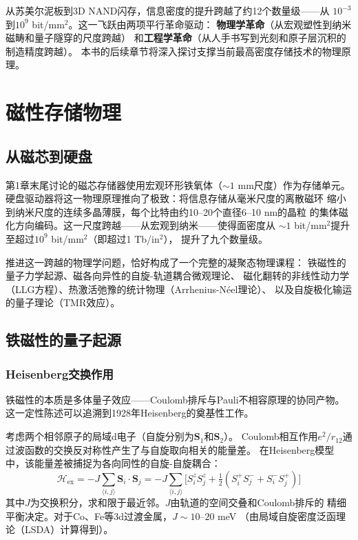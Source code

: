 \documentclass[11pt,a4paper,openany]{book}
\theoremstyle{definition}
\theoremstyle{plain}
\theoremstyle{remark}
\begin{document}
从苏美尔泥板到3D NAND闪存，信息密度的提升跨越了约12个数量级——从
$10^{-3}$到$10^9$ bit/mm$^2$。这一飞跃由两项平行革命驱动：
\textbf{物理学革命}（从宏观塑性到纳米磁畴和量子隧穿的尺度跨越）
和\textbf{工程学革命}（从人手书写到光刻和原子层沉积的制造精度跨越）。
本书的后续章节将深入探讨支撑当前最高密度存储技术的物理原理。

\chapter{磁性存储物理}
\label{ch:magnetic}

\section{从磁芯到硬盘}

第1章末尾讨论的磁芯存储器使用宏观环形铁氧体（$\sim 1$ mm尺度）作为存储单元。
硬盘驱动器将这一物理原理推向了极致：将信息存储从毫米尺度的离散磁环
缩小到纳米尺度的连续多晶薄膜，每个比特由约10--20个直径6--10 nm的晶粒
的集体磁化方向编码。这一尺度跨越——从宏观到纳米——使得面密度从
$\sim 1$ bit/mm$^2$提升至超过$10^9$ bit/mm$^2$（即超过1 Tb/in$^2$），
提升了九个数量级。

推进这一跨越的物理学问题，恰好构成了一个完整的凝聚态物理课程：
铁磁性的量子力学起源、磁各向异性的自旋-轨道耦合微观理论、
磁化翻转的非线性动力学（LLG方程）、热激活弛豫的统计物理（Arrhenius-N\'{e}el理论）、
以及自旋极化输运的量子理论（TMR效应）。

\section{铁磁性的量子起源}

\subsection{Heisenberg交换作用}

铁磁性的本质是多体量子效应——Coulomb排斥与Pauli不相容原理的协同产物。
这一定性陈述可以追溯到1928年Heisenberg的奠基性工作。

考虑两个相邻原子的局域d电子（自旋分别为$\mathbf{S}_1$和$\mathbf{S}_2$）。
Coulomb相互作用$e^2/r_{12}$通过波函数的交换反对称性产生了与自旋取向相关的能量差。
在Heisenberg模型中，该能量差被捕捉为各向同性的自旋-自旋耦合：
\begin{equation}\label{eq:heisenberg}
  \mathcal{H}_{\text{ex}} = -J \sum_{\langle i,j\rangle} \mathbf{S}_i \cdot \mathbf{S}_j
  = -J \sum_{\langle i,j\rangle} \bigl[ S_i^z S_j^z
    + \tfrac{1}{2}(S_i^+ S_j^- + S_i^- S_j^+) \bigr]
\end{equation}
其中$J$为交换积分，求和限于最近邻。$J$由轨道的空间交叠和Coulomb排斥的
精细平衡决定。对于Co、Fe等3d过渡金属，$J \sim 10$--$20$ meV
（由局域自旋密度泛函理论（LSDA）计算得到）。
\end{document}
